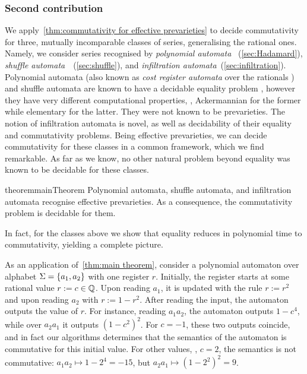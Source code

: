 \subsubsection*{Second contribution}
%
We apply~\cref{thm:commutativity for effective prevarieties} to decide commutativity
for three, mutually incomparable classes of series, generalising the rational ones.
%
Namely, we consider series recognised by \emph{polynomial automata}\-
\cite{BenediktDuffSharadWorrell:PolyAut:LICS:2017}~(\cref{sec:Hadamard}),
\emph{shuffle automata}~\cite{Clemente:CONCUR:2024}~(\cref{sec:shuffle}),
and \emph{infiltration automata}~(\cref{sec:infiltration}).
%
%
Polynomial automata (also known as \emph{cost register automata} over the rationals\-
\cite{AlurDAntoniDeshmukhRaghothamanYuan:LICS:2013})
and shuffle automata are known to have a decidable equality problem\-
\cite{BenediktDuffSharadWorrell:PolyAut:LICS:2017,Clemente:CONCUR:2024},
however they have very different computational properties,
\eg, Ackermannian for the former while elementary for the latter.
%
They were not known to be prevarieties.
%
The notion of infiltration automata is novel,
as well as decidability of their equality and commutativity problems.
%
Being effective prevarieties,
we can decide commutativity for these classes in a common framework,
which we find remarkable.
%
As far as we know, no other natural problem beyond equality
was known to be decidable for these classes.
%
\begin{restatable}{theorem}{mainTheorem}%
    \label{thm:main theorem}
    Polynomial automata, shuffle automata, and infiltration automata
    recognise effective prevarieties.
    As a consequence, the commutativity problem is decidable for them.
\end{restatable}
%
\noindent
In fact, for the classes above we show that equality reduces in polynomial time to commutativity,
yielding a complete picture.

\begin{example}
    \label{ex:intro:1}
    As an application of~\cref{thm:main theorem},
    consider a polynomial automaton over alphabet $\Sigma = \left\{a_1, a_2\right\}$ with one register $r$.
    Initially, the register starts at some rational value $r := c \in \mathbb Q$.
    Upon reading $a_1$, it is updated with the rule $r := r^2$
    and upon reading $a_2$ with $r := 1 - r^2$.
    After reading the input, the automaton outputs the value of $r$.
    For instance, reading $a_1 a_2$, the automaton outputs $1 - c^4$,
    while over $a_2 a_1$ it outputs $(1 - c^2)^2$.
    For $c = -1$, these two outputs coincide,
    and in fact our algorithms determines that
    the semantics of the automaton is commutative for this initial value.
    For other values, \eg, $c = 2$, the semantics is not commutative:
    $a_1 a_2 \mapsto 1 - 2^4 = -15$,
    but $a_2 a_1 \mapsto (1 - 2^2)^2 = 9$.
\end{example}

